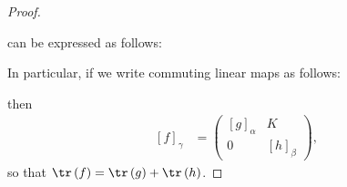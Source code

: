 \documentclass[10pt]{mypackage}
\begin{document}
\begin{proof}
\begin{center}
  \end{center}
  can be expressed as follows:
  \begin{center}
  \end{center}
  In particular, if we write commuting linear maps as follows:
  \begin{center}
  \end{center}
  then
  \begin{align*}
    \left[ f \right]_{\gamma} &= \begin{pmatrix}\left[ g \right]_{\alpha} & K \\ 0 & \left[ h \right]_{\beta}\end{pmatrix},
  \end{align*}
  so that $\tr\left( f \right) = \tr\left( g \right) + \tr\left( h \right)$.


\end{proof}
\end{document}
